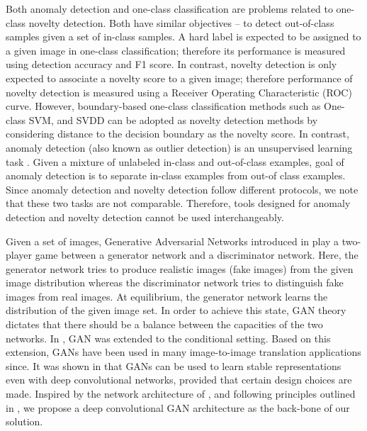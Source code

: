 \documentclass[10pt,twocolumn,letterpaper]{article}
\begin{document}
 Both anomaly detection \cite{ICCVoutlier} and one-class classification \cite{Scholkopf:2001:ESH:1119748.1119749} are problems related to one-class novelty detection. Both have  similar  objectives -- to detect out-of-class samples given a set of in-class samples. A hard label is expected to be assigned to a given image in one-class classification; therefore its performance is measured using detection accuracy and F1 score. In contrast, novelty detection is only expected to associate a novelty score to a given image; therefore performance of novelty detection is measured using a Receiver Operating Characteristic (ROC) curve. However, boundary-based one-class classification methods such as One-class SVM, and SVDD can be adopted as novelty detection methods by considering distance to the decision boundary as the novelty score. In contrast, anomaly detection (also known as outlier detection) is an unsupervised learning task \cite{ICCVoutlier}. Given a mixture of unlabeled in-class and out-of-class examples, goal of anomaly detection is to separate in-class examples from out-of class examples. Since anomaly detection and novelty detection follow different protocols, we note that these two tasks are not comparable. Therefore, tools designed for anomaly detection and novelty detection cannot be used interchangeably.


 Given a set of images, Generative Adversarial Networks introduced in \cite{goodfellow2014generative} play a two-player game between a generator network and a discriminator network. Here, the generator network tries to produce realistic images (fake images) from the given image distribution whereas the discriminator network tries to distinguish fake images from real images. At equilibrium, the generator network learns the distribution of the given image set. In order to achieve this state, GAN theory dictates that there should be a balance between the capacities of the two networks. In \cite{mirza2014conditional}, GAN was extended to the conditional setting. Based on this extension, GANs have been used in many image-to-image translation applications since. It was shown in \cite{DCGAN} that GANs can be used to learn stable representations even with deep convolutional networks, provided that certain design choices are made. Inspired by the network architecture of \cite{cvpr2018}, and following principles outlined in \cite{DCGAN}, we propose a deep convolutional GAN architecture as the back-bone of our solution. 
\end{document}
